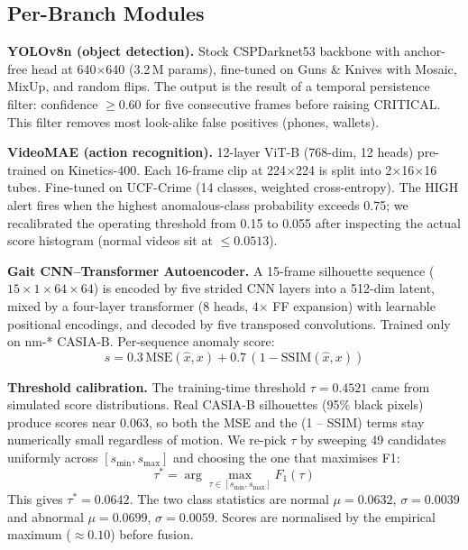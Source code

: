 \documentclass[runningheads]{llncs}
\begin{document}
\FloatBarrier

\subsection{Per-Branch Modules}

\textbf{YOLOv8n (object detection).} Stock CSPDarknet53 backbone with anchor-free head at 640$\times$640 (3.2\,M params), fine-tuned on Guns \& Knives with Mosaic, MixUp, and random flips. The output is the result of a temporal persistence filter: confidence $\geq 0.60$ for five consecutive frames before raising CRITICAL. This filter removes most look-alike false positives (phones, wallets).

\textbf{VideoMAE (action recognition).} 12-layer ViT-B (768-dim, 12 heads) pre-trained on Kinetics-400. Each 16-frame clip at 224$\times$224 is split into 2$\times$16$\times$16 tubes. Fine-tuned on UCF-Crime (14 classes, weighted cross-entropy). The HIGH alert fires when the highest anomalous-class probability exceeds 0.75; we recalibrated the operating threshold from 0.15 to 0.055 after inspecting the actual score histogram (normal videos sit at $\leq 0.0513$).

\textbf{Gait CNN--Transformer Autoencoder.} A 15-frame silhouette sequence ($15{\times}1{\times}64{\times}64$) is encoded by five strided CNN layers into a 512-dim latent, mixed by a four-layer transformer (8 heads, 4$\times$ FF expansion) with learnable positional encodings, and decoded by five transposed convolutions. Trained only on nm-* CASIA-B. Per-sequence anomaly score:
\begin{equation}
  s = 0.3\,\text{MSE}(\hat{x}, x) + 0.7\,(1 - \text{SSIM}(\hat{x}, x))
  \label{eq:score}
\end{equation}

\textbf{Threshold calibration.} The training-time threshold $\tau = 0.4521$ came from simulated score distributions. Real CASIA-B silhouettes (95\% black pixels) produce scores near 0.063, so both the MSE and the (1 -- SSIM) terms stay numerically small regardless of motion. We re-pick $\tau$ by sweeping 49 candidates uniformly across $[s_{\min},s_{\max}]$ and choosing the one that maximises F1:
\begin{equation}
  \tau^* = \arg\max_{\tau \in [s_{\min}, s_{\max}]} F_1(\tau)
  \label{eq:thresh}
\end{equation}
This gives $\tau^* = 0.0642$. The two class statistics are normal $\mu = 0.0632$, $\sigma = 0.0039$ and abnormal $\mu = 0.0699$, $\sigma = 0.0059$. Scores are normalised by the empirical maximum ($\approx 0.10$) before fusion.
\end{document}
